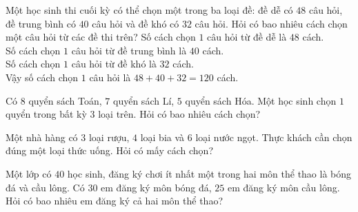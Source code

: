 \begin{bt}%
	Một học sinh thi cuối kỳ có thể chọn một trong ba loại đề: đề dễ có $48$ câu hỏi, đề trung bình có $40$ câu hỏi và đề khó có $32$ câu hỏi. Hỏi có bao nhiêu cách chọn một câu hỏi từ các đề thi trên?
	\loigiai
	{
		Số cách chọn $1$ câu hỏi từ đề dễ là $48$ cách.\\
		Số cách chọn $1$ câu hỏi từ đề trung bình là $40$ cách.\\
		Số cách chọn $1$ câu hỏi từ đề khó là $32$ cách.\\
		Vậy số cách chọn $1$ câu hỏi là $48+40+32=120$ cách.
	}
\end{bt}

\begin{bt}%
	Có $8$ quyển sách Toán, $7$ quyển sách Lí, $5$ quyển sách Hóa. Một học sinh chọn $1$ quyển trong bất kỳ $3$ loại trên. Hỏi có bao nhiêu cách chọn? 
\end{bt}

\begin{bt}%
	Một nhà hàng có $3$ loại rượu, $4$ loại bia và $6$ loại nước ngọt. Thực khách cần chọn đúng một loại thức uống. Hỏi có mấy cách chọn?  
\end{bt}

\begin{bt}%
	Một lớp có $40$ học sinh, đăng ký chơi ít nhất một trong hai môn thể thao là bóng đá và cầu lông. Có $30$ em đăng ký môn bóng đá, $25$ em đăng ký môn cầu lông. Hỏi có bao nhiêu em đăng ký cả hai môn thể thao?
\end{bt}

